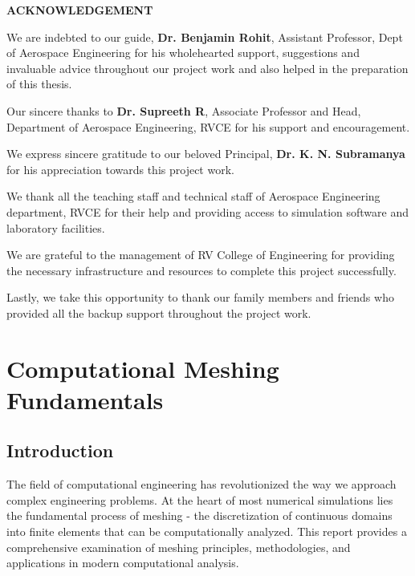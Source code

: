 \documentclass{book}
\begin{document}
\newpage
\thispagestyle{empty}

\begin{center}
{\Large \textbf{ACKNOWLEDGEMENT}}
\end{center}

\vspace{1.5cm}

We are indebted to our guide, \textbf{Dr. Benjamin Rohit}, Assistant Professor, Dept of Aerospace Engineering for his wholehearted support, suggestions and invaluable advice throughout our project work and also helped in the preparation of this thesis.

Our sincere thanks to \textbf{Dr. Supreeth R}, Associate Professor and Head, Department of Aerospace Engineering, RVCE for his support and encouragement.

We express sincere gratitude to our beloved Principal, \textbf{Dr. K. N. Subramanya} for his appreciation towards this project work.

We thank all the teaching staff and technical staff of Aerospace Engineering department, RVCE for their help and providing access to simulation software and laboratory facilities.

We are grateful to the management of RV College of Engineering for providing the necessary infrastructure and resources to complete this project successfully.

Lastly, we take this opportunity to thank our family members and friends who provided all the backup support throughout the project work.

\newpage

\tableofcontents

\newpage

\listoftables

\newpage

\listoffigures

\newpage

\part{Computational Meshing Fundamentals}

\chapter{Introduction}

The field of computational engineering has revolutionized the way we approach complex engineering problems. At the heart of most numerical simulations lies the fundamental process of meshing - the discretization of continuous domains into finite elements that can be computationally analyzed. This report provides a comprehensive examination of meshing principles, methodologies, and applications in modern computational analysis.
\end{document}
